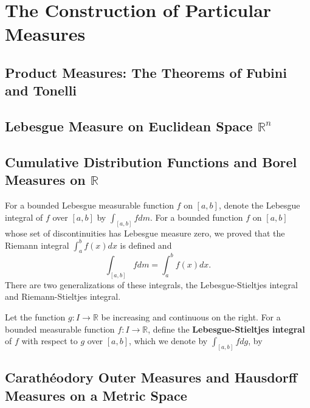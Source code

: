 \chapter{The Construction of Particular Measures}

\section{Product Measures: The Theorems of Fubini and Tonelli}

\section{Lebesgue Measure on Euclidean Space $\mathbb{R}^n$}

\section{Cumulative Distribution Functions and Borel Measures on $\mathbb{R}$}
For a bounded Lebesgue measurable function $f$ on $[a,b]$, denote the Lebesgue integral of $f$ over $[a,b]$ by $\int_{[a,b]}fdm$.
For a bounded function $f$ on $[a,b]$ whose set of discontinuities has Lebesgue measure zero, we proved that the Riemann integral $\int_a^bf(x)dx$ is defined and 
\[
    \int_{[a,b]}fdm=\int_a^bf(x)dx.
\]
There are two generalizations of these integrals, the Lebesgue-Stieltjes integral and Riemann-Stieltjes integral.

Let the function $g:I\to\mathbb{R}$ be increasing and continuous on the right.
For a bounded measurable function $f:I\to\mathbb{R}$, define the \textbf{Lebesgue-Stieltjes integral} of $f$ with respect to $g$ over $[a,b]$, which we denote by $\int_{[a,b]}fdg$, by

\section{Carath\'eodory Outer Measures and Hausdorff Measures on a Metric Space}
